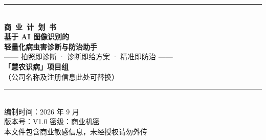 \documentclass[UTF8, a4paper, 11pt, oneside]{ctexrep}
\begin{document}
\begin{titlepage}
  \centering
  \vspace*{2.2cm}
  {\color{maingreen}\rule{\linewidth}{2.5pt}}\\[0.6cm]
  {\bfseries 商\ 业\ 计\ 划\ 书}\\[1.0cm]
  {\bfseries\color{maingreen} 基于 AI 图像识别的\\[0.4em] 轻量化病虫害诊断与防治助手}\\[1.2cm]
  {\color{grayline} —— 拍照即诊断 · 诊断即给方案 · 精准即防治 ——}\\[2.0cm]
  {\bfseries 「慧农识病」项目组}\\[0.4cm]
  {\color{grayline} （公司名称及注册信息此处可替换）}\\[1.6cm]
  {\color{maingreen}\rule{\linewidth}{1.5pt}}\\[0.8cm]
  { 编制时间：2026 年 9 月}\\[0.3cm]
  {\color{grayline} 版本号：V1.0 \quad 密级：商业机密}\\[0.2cm]
  \vfill
  {\color{grayline} 本文件包含商业敏感信息，未经授权请勿外传}
  \vspace*{1.2cm}
\end{titlepage}

\tableofcontents
\clearpage













\end{document}
